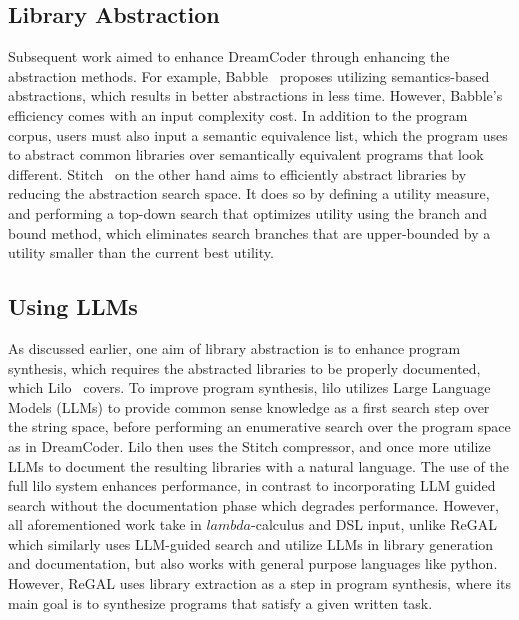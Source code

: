 \subsection{Library Abstraction}
Subsequent work aimed to enhance DreamCoder through enhancing the abstraction methods. For example, Babble~\cite{Cao_2023babble} proposes utilizing semantics-based abstractions, which results in better abstractions in less time. However, Babble's efficiency comes with an input complexity cost. In addition to the program corpus, users must also input a semantic equivalence list, which the program uses to abstract common libraries over semantically equivalent programs that look different. Stitch~\cite{Bowers_2023stitch} on the other hand aims to efficiently abstract libraries by reducing the abstraction search space. It does so by defining a utility measure, and performing a top-down search that optimizes utility using the branch and bound method, which eliminates search branches that are upper-bounded by a utility smaller than the current best utility. 

\subsection{Using LLMs}
As discussed earlier, one aim of library abstraction is to enhance program synthesis, which requires the abstracted libraries to be properly documented, which Lilo~\cite{grand2024lilo} covers. To improve program synthesis, lilo utilizes Large Language Models (LLMs) to provide common sense knowledge as a first search step over the string space, before performing an enumerative search over the program space as in DreamCoder. Lilo then uses the Stitch compressor, and once more utilize LLMs to document the resulting libraries with a natural language. The use of the full lilo system enhances performance, in contrast to incorporating LLM guided search without the documentation phase which degrades performance. However, all aforementioned work take in \(lambda\)-calculus and DSL input, unlike ReGAL~\cite{stengeleskin2024regal} which similarly uses LLM-guided search and utilize LLMs in library generation and documentation, but also works with general purpose languages like python. However, ReGAL uses library extraction as a step in program synthesis, where its main goal is to synthesize programs that satisfy a given written task. 

